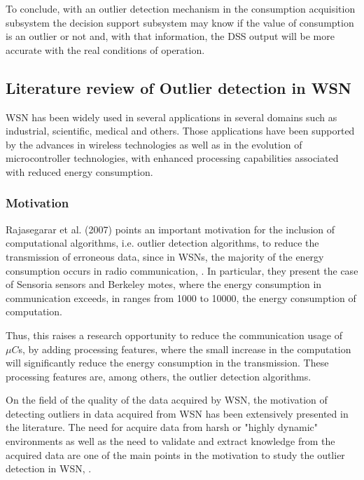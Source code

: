 To conclude, with an outlier detection mechanism in the consumption acquisition subsystem the decision support subsystem may know if the value of consumption is an outlier or not and, with that information, the \ac{DSS} output will be more accurate with the real conditions of operation.


\subsection{Literature review of Outlier detection in \ac{WSN}}
\label{sec:od_wsn}
\ac{WSN} has been widely used in several applications in several domains such as industrial, scientific, medical and others. Those applications have been supported by the advances in wireless technologies as well as in the evolution of microcontroller technologies, with enhanced processing capabilities associated with reduced energy consumption.

\subsubsection{Motivation}

Rajasegarar et al. (2007) points an important motivation for the inclusion of computational algorithms, i.e. outlier detection algorithms, to reduce the transmission of erroneous data, since in WSNs, the majority of the energy consumption occurs in radio communication, \cite{class:rajasegarar:2007}. In particular, they present the case of Sensoria sensors and Berkeley motes, where the energy consumption in communication exceeds, in ranges from 1000 to 10000, the energy consumption of computation.

Thus, this raises a research opportunity to reduce the communication usage of $\mu C$s, by adding processing features, where the small increase in the computation will significantly reduce the energy consumption in the transmission. These processing features are, among others, the outlier detection algorithms.


On the field of the quality of the data acquired by \ac{WSN}, the motivation of detecting outliers in data acquired from \ac{WSN} has been extensively presented in the literature. The need for acquire data from harsh or "highly dynamic" environments as well as the need to validate and extract knowledge from the acquired data are one of the main points in the motivation to study the outlier detection in \ac{WSN},  \cite{gen:zhang:2010,gen:chandola:2009,stat:ghorbel:2015,class:martins:2015b}.



